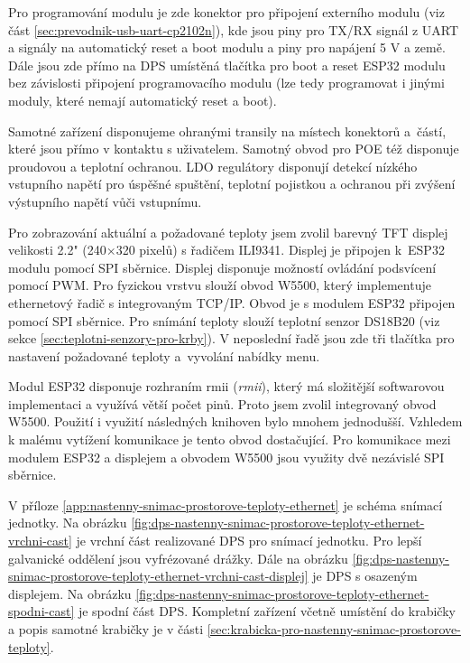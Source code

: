 Pro programování modulu je zde konektor pro připojení externího modulu (viz část \ref{sec:prevodnik-usb-uart-cp2102n}), kde jsou piny pro TX/RX signál z UART a signály na automatický reset a boot modulu a piny pro napájení 5 V a země. Dále jsou zde přímo na DPS umístěná tlačítka pro boot a reset ESP32 modulu bez závislosti připojení programovacího modulu (lze tedy programovat i jinými moduly, které nemají automatický reset a boot). 

Samotné zařízení disponujeme ohranými transily na místech konektorů a~částí, které jsou přímo v kontaktu s uživatelem. Samotný obvod pro POE též disponuje proudovou a teplotní ochranou. LDO regulátory disponují detekcí nízkého vstupního napětí pro úspěšné spuštění, teplotní pojistkou a ochranou při zvýšení výstupního napětí vůči vstupnímu. 

Pro zobrazování aktuální a požadované teploty jsem zvolil barevný TFT displej velikosti 2.2" (240×320 pixelů) s řadičem ILI9341. Displej je připojen k~ESP32 modulu pomocí SPI sběrnice. Displej disponuje možností ovládání podsvícení pomocí PWM. Pro fyzickou vrstvu slouží obvod W5500, který implementuje ethernetový řadič s integrovaným TCP/IP. Obvod je s modulem ESP32 připojen pomocí SPI sběrnice. Pro snímání teploty slouží teplotní senzor DS18B20 (viz sekce \ref{sec:teplotni-senzory-pro-krby}). V neposlední řadě jsou zde tři tlačítka pro nastavení požadované teploty a~vyvolání nabídky menu.

Modul ESP32 disponuje rozhraním \acrshort{rmii} (\textit{\acrlong{rmii}}), který má složitější softwarovou implementaci a využívá větší počet pinů. Proto jsem zvolil integrovaný obvod W5500. Použití i využití následných knihoven bylo mnohem jednodušší. Vzhledem k malému vytížení komunikace je tento obvod dostačující. Pro komunikace mezi modulem ESP32 a displejem a obvodem W5500 jsou využity dvě nezávislé SPI sběrnice. 

V příloze \ref{app:nastenny-snimac-prostorove-teploty-ethernet} je schéma snímací jednotky. Na obrázku \ref{fig:dps-nastenny-snimac-prostorove-teploty-ethernet-vrchni-cast} je vrchní část realizované DPS pro snímací jednotku. Pro lepší galvanické oddělení jsou vyfrézované drážky. Dále na obrázku \ref{fig:dps-nastenny-snimac-prostorove-teploty-ethernet-vrchni-cast-displej} je DPS s osazeným displejem. Na obrázku \ref{fig:dps-nastenny-snimac-prostorove-teploty-ethernet-spodni-cast} je spodní část DPS. Kompletní zařízení včetně umístění do krabičky a popis samotné krabičky je v části \ref{sec:krabicka-pro-nastenny-snimac-prostorove-teploty}.



